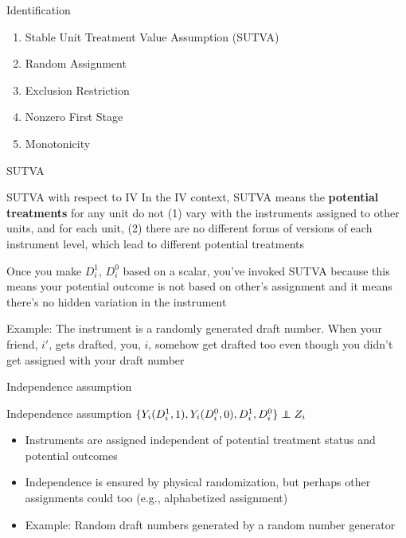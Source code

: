 \documentclass{beamer}
\newcommand\independent{\protect\mathpalette{\protect\independenT}{\perp}}
\def\independenT#1#2{\mathrel{\rlap{$#1#2$}\mkern2mu{#1#2}}}
\begin{document}
\begin{frame}{Identification}

  \begin{enumerate}
    \item Stable Unit Treatment Value Assumption (SUTVA)
    \item Random Assignment
    \item Exclusion Restriction
    \item Nonzero First Stage
    \item Monotonicity
  \end{enumerate}
\end{frame}


\begin{frame}{SUTVA}

  \begin{block}{SUTVA with respect to IV}
    In the IV context, SUTVA means the \textbf{potential treatments} for any unit do not (1) vary with the instruments assigned to other units, and for each unit, (2) there are no different forms of versions of each instrument level, which lead to different potential treatments
  \end{block}

  \bigskip

  Once you make $D^1_i$, $D^0_i$ based on a scalar, you've invoked SUTVA because this means your potential outcome is not based on other's assignment and it means there's no hidden variation in the instrument

  \bigskip

  Example:   The instrument is a randomly generated draft number. When your friend, $i'$, gets drafted, you, $i$, somehow get drafted too even though you didn't get assigned with your draft number


\end{frame}




\begin{frame}{Independence assumption}

  \begin{block}{Independence assumption}
    $\{Y_i(D^1_i,1),Y_i(D^0_i,0),D^1_{i},D^{0}_i\} \independent{Z}_i$
  \end{block}

  \begin{itemize}
    \item Instruments are assigned independent of potential treatment status and potential outcomes
    \item Independence is ensured by physical randomization, but perhaps other assignments could too (e.g., alphabetized assignment)
    \item Example: Random draft numbers generated by a random number generator
  \end{itemize}

\end{frame}
\end{document}
